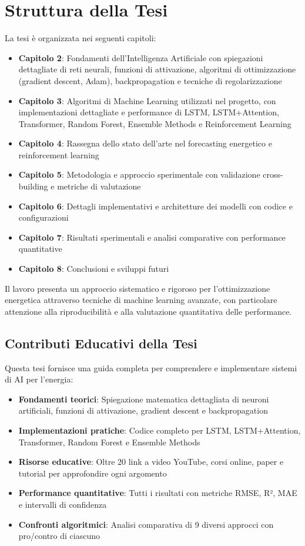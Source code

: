 \documentclass[12pt,a4paper,twoside]{report}
\begin{document}
\section{Struttura della Tesi}

La tesi è organizzata nei seguenti capitoli:

\begin{itemize}
    \item \textbf{Capitolo 2}: Fondamenti dell'Intelligenza Artificiale con spiegazioni dettagliate di reti neurali, funzioni di attivazione, algoritmi di ottimizzazione (gradient descent, Adam), backpropagation e tecniche di regolarizzazione
    \item \textbf{Capitolo 3}: Algoritmi di Machine Learning utilizzati nel progetto, con implementazioni dettagliate e performance di LSTM, LSTM+Attention, Transformer, Random Forest, Ensemble Methods e Reinforcement Learning
    \item \textbf{Capitolo 4}: Rassegna dello stato dell'arte nel forecasting energetico e reinforcement learning
    \item \textbf{Capitolo 5}: Metodologia e approccio sperimentale con validazione cross-building e metriche di valutazione
    \item \textbf{Capitolo 6}: Dettagli implementativi e architetture dei modelli con codice e configurazioni
    \item \textbf{Capitolo 7}: Risultati sperimentali e analisi comparative con performance quantitative
    \item \textbf{Capitolo 8}: Conclusioni e sviluppi futuri
\end{itemize}

Il lavoro presenta un approccio sistematico e rigoroso per l'ottimizzazione energetica attraverso tecniche di machine learning avanzate, con particolare attenzione alla riproducibilità e alla valutazione quantitativa delle performance.

\subsection{Contributi Educativi della Tesi}

Questa tesi fornisce una guida completa per comprendere e implementare sistemi di AI per l'energia:

\begin{itemize}
    \item \textbf{Fondamenti teorici}: Spiegazione matematica dettagliata di neuroni artificiali, funzioni di attivazione, gradient descent e backpropagation
    \item \textbf{Implementazioni pratiche}: Codice completo per LSTM, LSTM+Attention, Transformer, Random Forest e Ensemble Methods
    \item \textbf{Risorse educative}: Oltre 20 link a video YouTube, corsi online, paper e tutorial per approfondire ogni argomento
    \item \textbf{Performance quantitative}: Tutti i risultati con metriche RMSE, R², MAE e intervalli di confidenza
    \item \textbf{Confronti algoritmici}: Analisi comparativa di 9 diversi approcci con pro/contro di ciascuno
\end{itemize}
\end{document}
